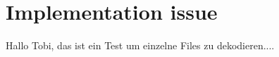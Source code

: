 \documentclass[Bachelorarbeit.tex]{subfiles}
\begin{document}
\chapter{Implementation issue}
Hallo Tobi, das ist ein Test um einzelne Files zu dekodieren....
\end{document}
